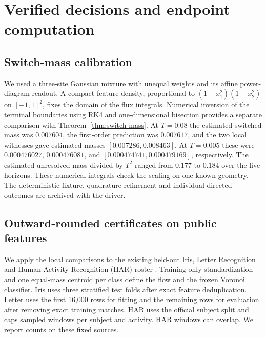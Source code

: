 \section{Verified decisions and endpoint computation}
\label{sec:verified-public}

\subsection{Switch-mass calibration}
We used a three-site Gaussian mixture with unequal weights and its
affine power-diagram readout. A compact feature density, proportional
to $(1-x_1^2)(1-x_2^2)$ on $[-1,1]^2$, fixes the domain of the flux
integrals. Numerical inversion of the terminal boundaries using RK4
and one-dimensional bisection provides a separate comparison with
Theorem~\ref{thm:switch-mass}. At $T=0.08$ the estimated switched mass
was $0.007604$, the first-order prediction was $0.007617$, and the two
local witnesses gave estimated masses $[0.007286,0.008463]$.
At $T=0.005$ these were $0.000476027$, $0.000476081$, and
$[0.000474741,0.000479169]$, respectively. The estimated unresolved
mass divided by $T^2$ ranged from $0.177$ to $0.184$ over the five
horizons. These numerical integrals check the scaling on one known
geometry. The deterministic fixture, quadrature refinement and
individual directed outcomes are archived with the driver.

\subsection{Outward-rounded certificates on public features}
We apply the local comparisons to the existing held-out Iris, Letter
Recognition and Human Activity Recognition (HAR) roster
\cite{iris,letter,har}. Training-only standardization and one equal-mass
centroid per class define the flow and the frozen Voronoi classifier.
Iris uses three stratified test folds after exact feature deduplication.
Letter uses the first 16,000 rows for fitting and the remaining rows
for evaluation after removing exact training matches. HAR uses the
official subject split and caps sampled windows per subject and activity.
HAR windows can overlap. We report counts on these fixed sources.

